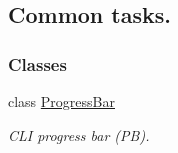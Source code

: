 \hypertarget{group__CommonFunctions}{
\subsection{Common tasks.}
\label{group__CommonFunctions}
}
\subsubsection*{Classes}
\begin{DoxyCompactItemize}
\item 
class \hyperlink{classProgressBar}{ProgressBar}
\begin{DoxyCompactList}\small\item\em CLI progress bar (PB). \item\end{DoxyCompactList}\end{DoxyCompactItemize}
